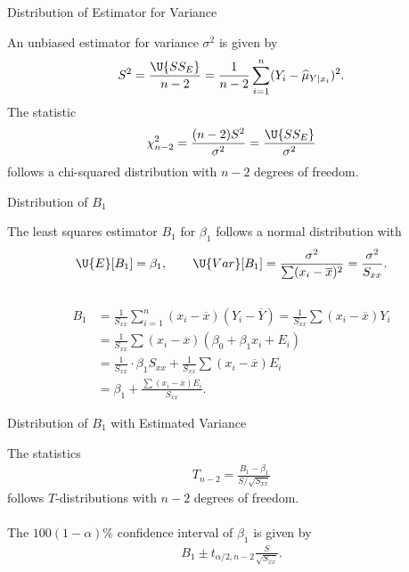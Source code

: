 \begin{frame}{Distribution of Estimator for Variance}

 An unbiased estimator for variance $\sigma^2$ is given by
\begin{align*}
S^2 = \frac{\U{SS_E}}{n-2} = \frac{1}{n-2}\sum_{i=1}^n (Y_i-\widehat{\mu}_{Y|x_i})^2.
\end{align*}
 The statistic
\begin{align*}
\chi_{n-2}^2 = \frac{(n-2)S^2}{\sigma^2} = \frac{\U{SS_E}}{\sigma^2}
\end{align*}
follows a chi-squared distribution with $n-2$ degrees of freedom.

\end{frame}

\begin{frame}{Distribution of $B_1$}

 The least squares estimator $B_1$ for $\beta_1$ follows a normal distribution with
\footnotesize
\begin{align*}
\U{E}[B_1] = \beta_1, \qquad \U{Var}[B_1] = \frac{\sigma^2}{\sum (x_i-\overline{x})^2} = \frac{\sigma^2}{S_{xx}}.
\end{align*}\\
\normalsize
{}
\footnotesize
\begin{align*}
B_1 & = \frac{1}{S_{xx}} \sum_{i=1}^n(x_i-\overline{x})(Y_i-\overline{Y}) = \frac{1}{S_{xx}}\sum (x_i-\overline{x})Y_i \\
& = \frac{1}{S_{xx}} \sum (x_i-\overline{x})(\beta_0 + \beta_1 x_i + E_i) \\
& = \frac{1}{S_{xx}}\cdot \beta_1 S_{xx} + \frac{1}{S_{xx}} \sum (x_i-\overline{x})E_i \\
& = \beta_1 + \frac{\sum (x_i-\overline{x}) E_i}{S_{xx}}.
\end{align*}
\normalsize

\end{frame}

\begin{frame}{Distribution of $B_1$ with Estimated Variance}

\justifying
{} The statistics
\begin{align*}
T_{n-2} = \frac{B_1-\beta_1}{S/\sqrt{S_{xx}}}
\end{align*}
follows $T$-distributions with $n-2$ degrees of freedom. \\
~\\
 The $100(1-\alpha)\%$ confidence interval of $\beta_1$ is given by
\begin{align*}
B_1 \pm t_{\alpha/2,n-2}\frac{S}{\sqrt{S_{xx}}}.
\end{align*}

\end{frame}

